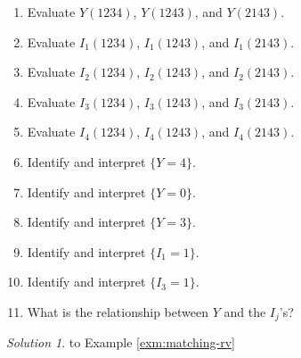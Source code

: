 \documentclass[
]{book}
\providecommand{\tightlist}{%
  \setlength{\itemsep}{0pt}\setlength{\parskip}{0pt}}
\theoremstyle{definition}
\theoremstyle{definition}
\theoremstyle{definition}
\theoremstyle{remark}
\newtheorem*{solution}{Solution}
\begin{document}
\begin{enumerate}
\def\labelenumi{\arabic{enumi}.}
\tightlist
\item
  Evaluate \(Y(1234)\), \(Y(1243)\), and \(Y(2143)\).
\item
  Evaluate \(I_1(1234)\), \(I_1(1243)\), and \(I_1(2143)\).
\item
  Evaluate \(I_2(1234)\), \(I_2(1243)\), and \(I_2(2143)\).
\item
  Evaluate \(I_3(1234)\), \(I_3(1243)\), and \(I_3(2143)\).
\item
  Evaluate \(I_4(1234)\), \(I_4(1243)\), and \(I_4(2143)\).
\item
  Identify and interpret \(\{Y=4\}\).
\item
  Identify and interpret \(\{Y=0\}\).
\item
  Identify and interpret \(\{Y=3\}\).
\item
  Identify and interpret \(\{I_1=1\}\).
\item
  Identify and interpret \(\{I_3=1\}\).
\item
  What is the relationship between \(Y\) and the \(I_j\)'s?
\end{enumerate}

\begin{solution}
{}to Example \ref{exm:matching-rv}
\end{solution}
\end{document}
